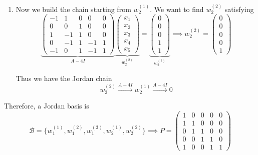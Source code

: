 \begin{example}
\begin{enumerate}
			\item Now we build the chain starting from $w_2^{(1)}$. We want to find $w_2^{(2)}$ satisfying
				\begin{equation}
					\underbrace{\begin{pmatrix}
						-1 & 1 & 0 & 0 & 0 \\
						0 & 0 & 1 & 0 & 0 \\
						1 & -1 & 1 & 0 & 0 \\
						0 & -1 & 1 & -1 & 1 \\
						-1 & 0 & 1 & -1 & 1
					\end{pmatrix}}_{A - 4I} \underbrace{\begin{pmatrix} x_1 \\ x_2 \\ x_3 \\ x_4 \\ x_5 \end{pmatrix}}_{w_2^{(2)}} = \underbrace{\begin{pmatrix} 0 \\ 0 \\ 0 \\ 1 \\ 1 \end{pmatrix}}_{w_2^{(1)}} \implies w_2^{(2)} = \begin{pmatrix} 0 \\ 0 \\ 0 \\ 0 \\ 1 \end{pmatrix}
				\end{equation}

				Thus we have the Jordan chain
				\begin{equation}
					w_2^{(2)} \xrightarrow{A - 4I} w_2^{(1)} \xrightarrow{A - 4I} 0
				\end{equation}
		\end{enumerate}

		Therefore, a Jordan basis is
		\begin{equation}
			\mathcal{B}
			=
			\big\{
				w_1^{(1)}, w_1^{(2)}, w_1^{(3)},
				w_2^{(1)}, w_2^{(2)}
			\big\} \implies P = \begin{pmatrix}
				1 & 0 & 0 & 0 & 0 \\
				1 & 1 & 0 & 0 & 0 \\
				0 & 1 & 1 & 0 & 0 \\
				0 & 0 & 1 & 1 & 0 \\
				1 & 0 & 0 & 1 & 1
			\end{pmatrix}
		\end{equation}


\end{example}
